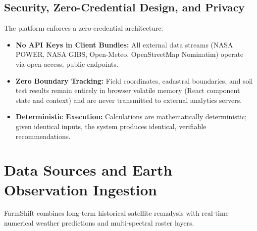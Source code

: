 \documentclass[11pt,a4paper]{report}
\begin{document}
\section{Security, Zero-Credential Design, and Privacy}
The platform enforces a zero-credential architecture:
\begin{itemize}
  \item \textbf{No API Keys in Client Bundles:} All external data streams (NASA POWER, NASA GIBS, Open-Meteo, OpenStreetMap Nominatim) operate via open-access, public endpoints.
  \item \textbf{Zero Boundary Tracking:} Field coordinates, cadastral boundaries, and soil test results remain entirely in browser volatile memory (React component state and context) and are never transmitted to external analytics servers.
  \item \textbf{Deterministic Execution:} Calculations are mathematically deterministic; given identical inputs, the system produces identical, verifiable recommendations.
\end{itemize}

\chapter{Data Sources and Earth Observation Ingestion}

FarmShift combines long-term historical satellite reanalysis with real-time numerical weather predictions and multi-spectral raster layers.
\end{document}
